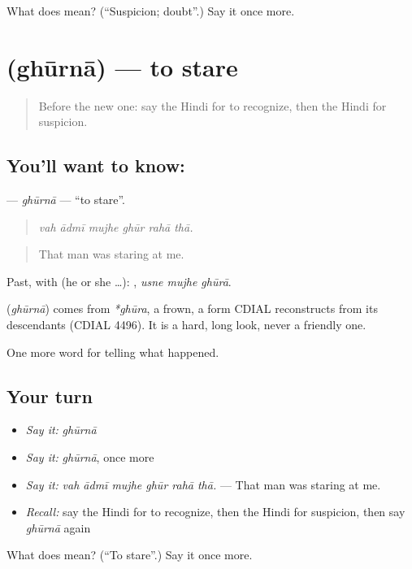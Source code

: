 \begin{tcolorbox}[breakable,colback=teal!4,colframe=teal!35!black,title={Before you move on}]
What does  mean? (\textquotedblleft{}Suspicion; doubt\textquotedblright{}.) Say it once more.
\end{tcolorbox}
\section[\texorpdfstring{\hi{घूरना} (ghūrnā)}{घूरना (ghūrnā)}]{ (ghūrnā) — to stare}

\label{lesson:HI-C291-ghurna}



\begin{quote}
Before the new one: say the Hindi for to recognize, then the Hindi for suspicion.
\end{quote}

\subsection*{You'll want to know: }
\textbf{} — \emph{ghūrnā} — \textquotedblleft{}to stare\textquotedblright{}.

\begin{quote}
     
\end{quote}

\begin{quote}
\emph{vah ādmī mujhe ghūr rahā thā.}
\end{quote}

\begin{quote}
That man was staring at me.
\end{quote}

Past, with  (he or she …):   , \emph{usne mujhe ghūrā}.

\begin{cousinweb}
\textbf{} (\emph{ghūrnā}) comes from \emph{*ghūra}, a frown, a form CDIAL reconstructs from its descendants (CDIAL 4496). It is a hard, long look, never a friendly one.
\end{cousinweb}

\begin{grammarlens}[title={What you've built}]
One more word for telling what happened.
\end{grammarlens}

\subsection*{Your turn}
\begin{itemize}
\raggedright
  \item \emph{Say it:} \emph{ghūrnā}
  \item \emph{Say it:} \emph{ghūrnā}, once more
  \item \emph{Say it:} \emph{vah ādmī mujhe ghūr rahā thā.} — That man was staring at me.
  \item \emph{Recall:} say the Hindi for to recognize, then the Hindi for suspicion, then say \emph{ghūrnā} again
\end{itemize}

\begin{tcolorbox}[breakable,colback=teal!4,colframe=teal!35!black,title={Before you move on}]
What does  mean? (\textquotedblleft{}To stare\textquotedblright{}.) Say it once more.
\end{tcolorbox}
